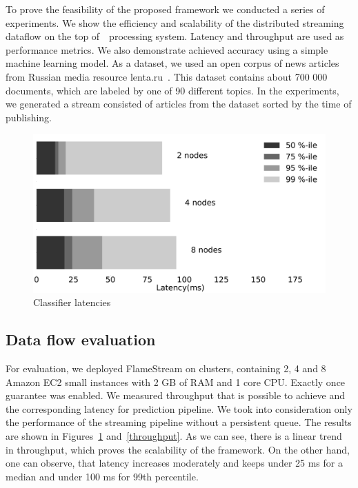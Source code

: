 \label {fs-experiments}

To prove the feasibility of the proposed framework we conducted a series of experiments. We show the efficiency and scalability of the distributed streaming dataflow on the top of~\FlameStream\ processing system. Latency and throughput are used as performance metrics. We also demonstrate achieved accuracy using a simple machine learning model. As a dataset, we used an open corpus of news articles from Russian media resource lenta.ru~\cite{lentaru}. This dataset contains about 700 000 documents, which are labeled by one of 90 different topics. In the experiments, we generated a stream consisted of articles from the dataset sorted by the time of publishing.

\begin{figure}[htbp]
  \centering
  \includegraphics[scale=0.1]{pics/classifier_latencies}
  \caption{Classifier latencies}
  \label {latencies}
\end{figure}

\subsection{Data flow evaluation}

For evaluation, we deployed FlameStream on clusters, containing 2, 4 and 8 Amazon EC2 small instances with 2 GB of RAM and 1 core CPU. Exactly once guarantee was enabled. We measured throughput that is possible to achieve and the corresponding latency for prediction pipeline. We took into consideration only the performance of the streaming pipeline without a persistent queue. The results are shown in Figures~\ref{latencies} and~\ref{throughput}. As we can see, there is a linear trend in throughput, which proves the scalability of the framework. On the other hand, one can observe, that latency increases moderately and keeps under 25 ms for a median and under 100 ms for 99th percentile.

